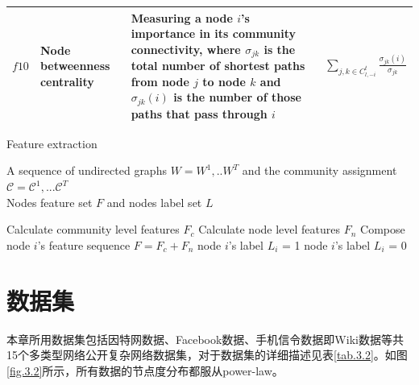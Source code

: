 \begin{table}[!htbp]
{\begin{tabular}{|l|p{70pt}|p{170pt}|l|}
			$f10$&Node betweenness centrality & Measuring a node $i$'s importance in its community connectivity, where $\sigma_{jk}$ is the total number of shortest paths from node $j$ to node $k$ and $\sigma_{jk}(i)$ is the number of those paths that pass through $i$ & $\sum_{j,k \in C_{l,-i}^t}\frac{\sigma_{jk}(i)}{\sigma_{jk}}$\\
			\hline
		\end{tabular}
	}
\end{table}


\begin{algorithm}[!htbp]
	\caption{Feature extraction}
	\label{alg1}
	\algorithmicrequire \quad A sequence of undirected graphs $W = {W}^1,..{W}^T$ and the community assignment $\mathcal{C} = \mathcal{C}^1,...\mathcal{C}^T$\\
	\algorithmicensure \quad Nodes feature set $F$ and nodes label set $L$
	\begin{algorithmic}[1]
		\STATE Calculate community level features $F_c$
		\STATE Calculate node level features $F_n$
		\STATE Compose node $i$'s feature sequence $F = F_c + F_n$
		\STATE node $i$'s label $L_i$ = 1
		\ELSE
		\STATE node $i$'s label $L_i$ = 0
		\ENDIF
		\ENDFOR
		\ENDFOR
		\ENDFOR
	\end{algorithmic}
\end{algorithm}




\section{数据集}

本章所用数据集包括因特网数据、Facebook数据、手机信令数据即Wiki数据等共15个多类型网络公开复杂网络数据集，对于数据集的详细描述见表\ref{tab.3.2}。如图\ref{fig.3.2}所示，所有数据的节点度分布都服从power-law。





